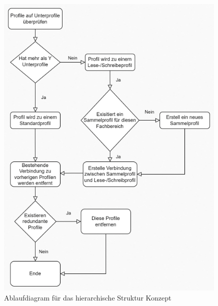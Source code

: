 \begin{figure}[h!]
 \centering
 \includegraphics[width=0.99\textwidth]{gfx/Picture/Hier.PNG}
 \caption{Ablaufdiagram für das hierarchische Struktur Konzept}
 \label{fig:Hier}
\end{figure}

\newpage

